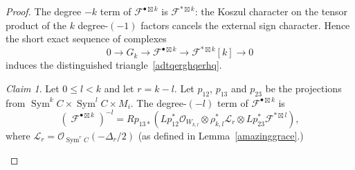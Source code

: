 \documentclass[11pt,letterpaper]{amsart}
\theoremstyle{plain}
\theoremstyle{definition}
\theoremstyle{remark}
\newtheorem{claim}[theorem]{Claim}
\numberwithin{equation}{section}
\DeclareMathOperator{\cF}{\mathcal{F}}
\begin{document}
\begin{proof}
The degree $-k$ term of $\mathcal F^{\bullet\boxtimes k}$ is $\mathcal F^{*\boxtimes k}$: the Koszul character on the
tensor product of the $k$ degree-$(-1)$ factors cancels the external sign
character. Hence the short exact sequence of complexes
\[
0\longrightarrow G_k\longrightarrow
\mathcal F^{\bullet\boxtimes k}\longrightarrow
\mathcal F^{*\boxtimes k}[k]\longrightarrow0
\]
induces the distinguished triangle~\eqref{adtqerghqerhq}.

 
 \begin{claim}\label{afsgarbar}
 Let $0\le l<k$ and let $r=k-l$.
 Let $p_{12}$, $p_{13}$ and $p_{23}$ be the projections
from
$\operatorname{Sym}^kC\times\operatorname{Sym}^lC\times M_i$.
The degree-$(-l)$ term of
$\mathcal F^{\bullet\boxtimes k}$ is
\begin{equation}\label{sergtergwerhqe5}
 \left(\cF^{\bullet\boxtimes k}\right)^{-l}=Rp_{13*}\!\left(
  Lp_{12}^* \mathcal O_{W_{k,l}}
  \otimes\rho_{k,l}^*\mathscr L_r
  \otimes Lp_{23}^*\mathcal F^{*\boxtimes l}
 \right),
 \end{equation}
 where $\mathscr L_r=\mathcal O_{\operatorname{Sym}^rC}(-\Delta_r/2)$
 (as defined in  Lemma~\ref{amazinggrace}.)
 \end{claim}
 

\end{proof}
\end{document}
